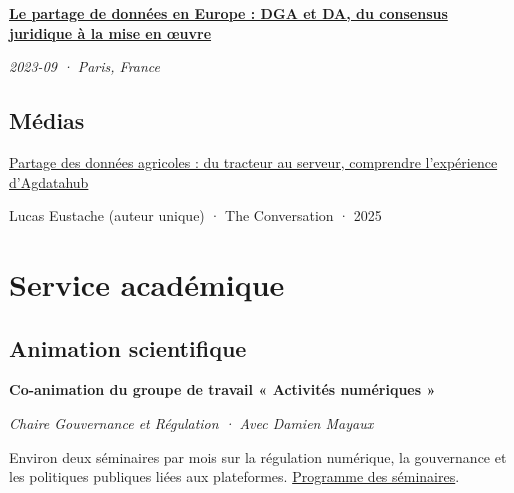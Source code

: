 \documentclass[11pt,a4paper]{article}
\newlength{\cvindent}
\let\cvoldsection\section
\renewcommand{\section}[1]{\Needspace{5\baselineskip}\cvoldsection{#1}}
\newenvironment{cvblock}[1][1]{%
  \par\noindent\hspace*{#1\cvindent}%
  \begin{minipage}{\dimexpr\linewidth-#1\cvindent\relax}%
}{%
  \end{minipage}\par
}
\newenvironment{cvdetails}{%
  \begin{list}{}{%
    \setlength{\leftmargin}{\cvindent}%
    \setlength{\rightmargin}{0pt}%
    \setlength{\topsep}{0.1em}%
    \setlength{\partopsep}{0pt}%
    \setlength{\parsep}{0.05em}%
    \setlength{\itemsep}{0pt}%
  }\item[]\small\ignorespaces
}{%
  \end{list}
}
\begin{document}
\begin{cvblock}[2]
\textbf{\href{https://chairgovreg.fondation-dauphine.fr/en/publication/1655/synthese-data-sharing-europe-dga-and-da-legal-consensus-achievement-implementation}{Le partage de données en Europe : DGA et DA, du consensus juridique à la mise en œuvre}}\par
\begin{cvdetails}
{\small\itshape 2023-09 · Paris, France}\par
\end{cvdetails}
\end{cvblock}\par\vspace{0.35em}

\subsection*{Médias}
\begin{cvblock}[2]
\href{https://theconversation.com/partage-des-donnees-agricoles-du-tracteur-au-serveur-comprendre-lexperience-dagdatahub-256597}{Partage des données agricoles : du tracteur au serveur, comprendre l'expérience d'Agdatahub}\par
\begin{cvdetails}
{\small Lucas Eustache (auteur unique) · The Conversation · 2025}\par
\end{cvdetails}
\end{cvblock}\par\vspace{0.35em}

\section{Service académique}
\subsection*{Animation scientifique}
\begin{cvblock}[2]
\textbf{Co-animation du groupe de travail « Activités numériques »}\par
\begin{cvdetails}
{\small\itshape Chaire Gouvernance et Régulation · Avec Damien Mayaux}\par
Environ deux séminaires par mois sur la régulation numérique, la gouvernance et les politiques publiques liées aux plateformes.
\href{https://acss-dig.psl.eu/fr/seminaires/digital-regulation}{Programme des séminaires}.
\end{cvdetails}
\end{cvblock}\par\vspace{0.35em}
\end{document}
